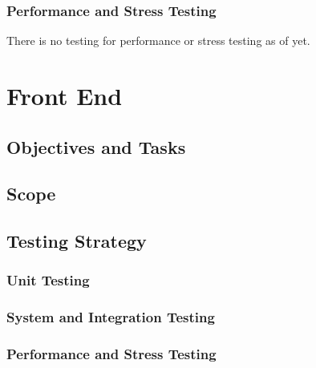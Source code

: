 \documentclass{article}
\begin{document}
			\subsubsection{Performance and Stress Testing}
			There is no testing for performance or stress testing as of yet.
\newpage

\section{Front End}
	\subsection{Objectives and Tasks}
		
	\subsection{Scope}
		
	\subsection{Testing Strategy}
		\subsubsection{Unit Testing}
		\subsubsection{System and Integration Testing}
		\subsubsection{Performance and Stress Testing}
\end{document}
